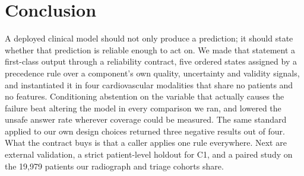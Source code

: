 \documentclass[conference,a4paper]{IEEEtran}
\begin{document}
\section{Conclusion}
A deployed clinical model should not only produce a prediction; it should state whether that prediction is reliable enough to act on. We made that statement a first-class output through a reliability contract, five ordered states assigned by a precedence rule over a component's own quality, uncertainty and validity signals, and instantiated it in four cardiovascular modalities that share no patients and no features. Conditioning abstention on the variable that actually causes the failure beat altering the model in every comparison we ran, and lowered the unsafe answer rate wherever coverage could be measured. The same standard applied to our own design choices returned three negative results out of four. What the contract buys is that a caller applies one rule everywhere. Next are external validation, a strict patient-level holdout for C1, and a paired study on the 19,979 patients our radiograph and triage cohorts share.
\end{document}

